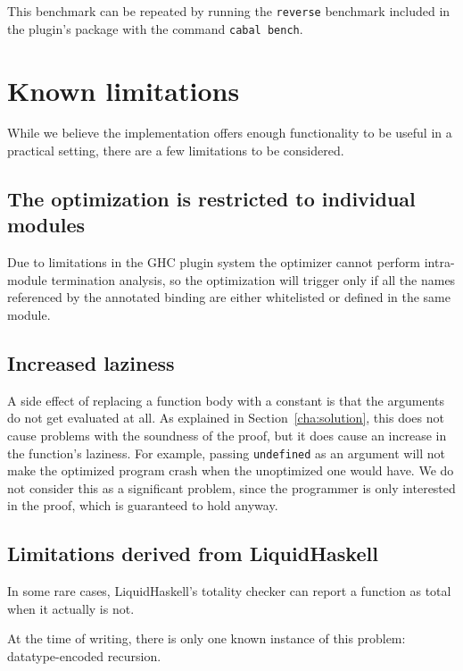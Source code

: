 This benchmark can be repeated by running the \texttt{reverse} benchmark included in the plugin's package with the command \texttt{cabal bench}.

\section{Known limitations}
\label{sec:limitations}

While we believe the implementation offers enough functionality to be useful in a practical setting, there are a few limitations to be considered.

\subsection{The optimization is restricted to individual modules}
\label{subsec:single-module}

Due to limitations in the GHC plugin system the optimizer cannot perform intra-module termination analysis, so the optimization will trigger only if all the names referenced by the annotated binding are either whitelisted or defined in the same module.

\subsection{Increased laziness}
\label{subsec:limitations-laziness}

A side effect of replacing a function body with a constant is that the arguments do not get evaluated at all.
As explained in Section~\ref{cha:solution}, this does not cause problems with the soundness of the proof, but it does cause an increase in the function's laziness.
For example, passing \texttt{undefined} as an argument will not make the optimized program crash when the unoptimized one would have.
We do not consider this as a significant problem, since the programmer is only interested in the proof, which is guaranteed to hold anyway.

\subsection{Limitations derived from LiquidHaskell}
\label{subsec:limitations-lh}

In some rare cases, LiquidHaskell's totality checker can report a function as total when it actually is not.

At the time of writing, there is only one known instance of this problem: datatype-encoded recursion.

